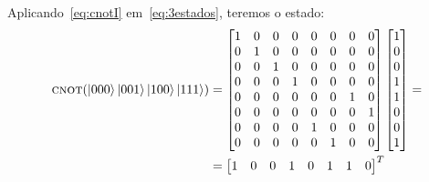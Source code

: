Aplicando~\eqref{eq:cnotI} em~\eqref{eq:3estados}, teremos o estado:
\begin{equation}\label{eq:cnot3estados}
	\begin{split}
		\operatorname{\textsc{cnot}} (\ket{000}\ket{001}\ket{100}\ket{111}) &= \begin{bmatrix}
		1 & 0 & 0 & 0 & 0 & 0 & 0 & 0 \\
		0 & 1 & 0 & 0 & 0 & 0 & 0 & 0 \\
		0 & 0 & 1 & 0 & 0 & 0 & 0 & 0 \\
		0 & 0 & 0 & 1 & 0 & 0 & 0 & 0 \\
		0 & 0 & 0 & 0 & 0 & 0 & 1 & 0 \\
		0 & 0 & 0 & 0 & 0 & 0 & 0 & 1 \\
		0 & 0 & 0 & 0 & 1 & 0 & 0 & 0 \\
		0 & 0 & 0 & 0 & 0 & 1 & 0 & 0 		
		\end{bmatrix} \begin{bmatrix}
		1 \\
		0 \\
		0 \\
		1 \\
		1 \\
		0 \\
		0 \\
		1
		\end{bmatrix} = \\
		&=\begin{bmatrix}
		1 & 0 &	0 & 1 &	0 &	1 &	1 &	0
		\end{bmatrix}^T
	\end{split}
\end{equation}

